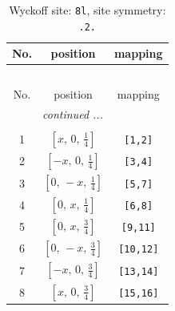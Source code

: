\documentclass[fleqn,8pt]{jsarticle}
\begin{document}
\begin{longtable}{ccc}
\caption{Wyckoff site: {\tt 8l}, site symmetry: {\tt .2.}}
 \\
 \hline \hline
No. & position & mapping \\ \hline \endfirsthead

\multicolumn{2}{l}{\tablename\ \thetable{}} \\
 \hline \hline
No. & position & mapping \\ \hline \endhead

 \hline \hline
\multicolumn{2}{r}{\footnotesize\it continued ...} \\ \endfoot

 \hline \hline
\multicolumn{2}{r}{} \\ \endlastfoot

1 & $\left[ x,\, 0,\, \frac{1}{4} \right]$ & {\tt [1,2]} \\ \hline
2 & $\left[ - x,\, 0,\, \frac{1}{4} \right]$ & {\tt [3,4]} \\ \hline
3 & $\left[ 0,\, - x,\, \frac{1}{4} \right]$ & {\tt [5,7]} \\ \hline
4 & $\left[ 0,\, x,\, \frac{1}{4} \right]$ & {\tt [6,8]} \\ \hline
5 & $\left[ 0,\, x,\, \frac{3}{4} \right]$ & {\tt [9,11]} \\ \hline
6 & $\left[ 0,\, - x,\, \frac{3}{4} \right]$ & {\tt [10,12]} \\ \hline
7 & $\left[ - x,\, 0,\, \frac{3}{4} \right]$ & {\tt [13,14]} \\ \hline
8 & $\left[ x,\, 0,\, \frac{3}{4} \right]$ & {\tt [15,16]} \\
\end{longtable}
\renewcommand{\arraystretch}{1.2}
\end{document}

